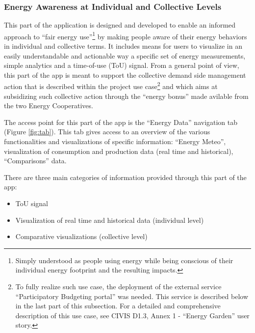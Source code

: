 \subsubsection{Energy Awareness at Individual and Collective Levels}
\label{sec:energydata}

This part of the application is designed and developed to enable an informed approach to ``fair energy use''\footnote{Simply understood as people using energy while
being conscious of their individual energy footprint and the resulting impacts.} by making people aware of their
energy behaviors in individual and collective terms.
%
It includes means for users to visualize in an easily
understandable and actionable way a specific set of energy measurements, simple analytics and a time-of-use (ToU) signal.
From a general point of view, this part of the app is meant to support the collective demand side management
action that is described within the project use case\footnote{To fully realize such use case, the deployment of the external service ``Participatory Budgeting portal''
was needed. This service is described below in the last part of this subsection.
For a detailed and comprehensive description of this use case, see CIVIS D1.3, Annex 1 - ``Energy Garden'' user story.}
and which aims at subsidizing such collective action through the ``energy bonus'' made avilable from the two Energy Cooperatives.

The access point for this part of the app is the ``Energy Data'' navigation tab (Figure \ref{fig:tab}). This tab gives access to an
overview of the various functionalities and visualizations of specific information: ``Energy Meteo'', visualization of consumption and production data (real time and historical),
``Comparisons'' data.

There are three main categories of information provided through this part of the app:
\begin{itemize}
 \item ToU signal
 \item Visualization of real time and historical data (individual level)
 \item Comparative visualizations (collective level)
\end{itemize}

